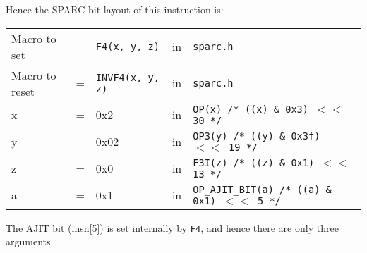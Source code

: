 \begin{enumerate}
  Hence the SPARC bit layout of this instruction is:

  \begin{tabular}[h]{lclcl}
    Macro to set  &=& \texttt{F4(x, y, z)} &in& \texttt{sparc.h}     \\
    Macro to reset  &=& \texttt{INVF4(x, y, z)} &in& \texttt{sparc.h}     \\
    x &=& 0x2      &in& \texttt{OP(x)  /* ((x) \& 0x3)  $<<$ 30 */} \\
    y &=& 0x02     &in& \texttt{OP3(y) /* ((y) \& 0x3f) $<<$ 19 */} \\
    z &=& 0x0      &in& \texttt{F3I(z) /* ((z) \& 0x1)  $<<$ 13 */} \\
    a &=& 0x1      &in& \texttt{OP\_AJIT\_BIT(a) /* ((a) \& 0x1)  $<<$ 5 */}
  \end{tabular}

  The AJIT bit  (insn[5]) is set internally by  \texttt{F4}, and hence
  there are only three arguments.


\end{enumerate}
